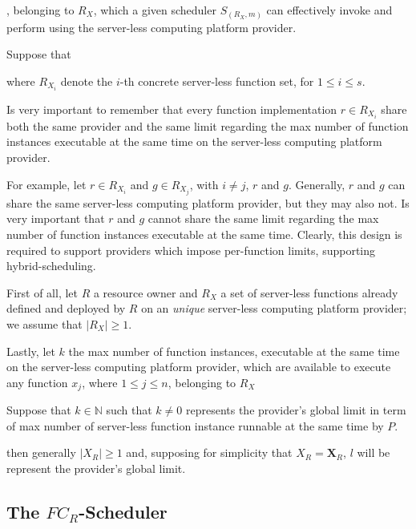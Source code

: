 \documentclass[10pt,a4paper]{article}
\begin{document}
, belonging to $R_{X}$, which a given scheduler $S_{({R_{X}},m)}$ can effectively invoke and perform using the server-less computing platform provider.




Suppose that 


where $R_{{X}_{i}}$ denote the $i$-th concrete server-less function set, for $1 \leq i \leq s$.

Is very important to remember that every function implementation $r \in R_{{X}_{i}}$ share both the same provider and the same limit regarding the max number of function instances executable at the same time on the server-less computing platform provider.  

For example, let $r \in R_{{X}_{i}}$ and $g \in R_{{X}_{j}}$, with $i \neq j$, $r$ and $g$. Generally, $r$ and $g$ can share the same server-less computing platform provider, but they may also not. Is very important that $r$ and $g$ cannot share the same limit regarding the max number of function instances executable at the same time. Clearly, this design is required to support providers which impose per-function limits, supporting hybrid-scheduling.






First of all, let $R$ a resource owner and $R_{X}$ a set of server-less functions already defined and deployed by $R$ on an \textit{unique} server-less computing platform provider; we assume that $|R_{X}| \geq 1$.

Lastly, let $k$ the max number of function instances, executable at the same time on the server-less computing platform provider, which are available to execute any function $x_j$, where $1 \leq j \leq n$, belonging to $R_{X}$





Suppose that $k \in \mathbb{N}$ such that $k \neq 0$ represents the provider's global limit in term of max number of server-less function instance runnable at the same time by $P$.







then generally $|X_{R}| \geq 1$ and, supposing for simplicity that $X_{R} = \textbf{X}_R$, $l$ will be represent the provider's global limit.


\subsection{The $FC_R$-Scheduler}
\end{document}
